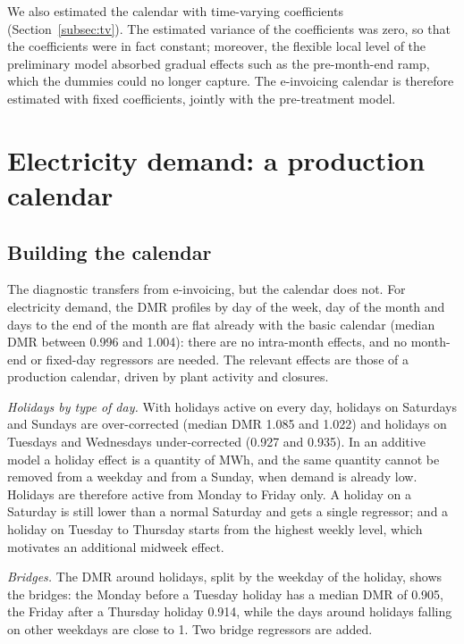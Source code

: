 \documentclass[Afour, times]{sagej}
\begin{document}
We also estimated the calendar with time-varying coefficients (Section~\ref{subsec:tv}). The estimated variance of the coefficients was zero, so that the coefficients were in fact constant; moreover, the flexible local level of the preliminary model absorbed gradual effects such as the pre-month-end ramp, which the dummies could no longer capture. The e-invoicing calendar is therefore estimated with fixed coefficients, jointly with the pre-treatment model.

\section{Electricity demand: a production calendar}
\label{sec:el}

\subsection{Building the calendar}

The diagnostic transfers from e-invoicing, but the calendar does not. For electricity demand, the DMR profiles by day of the week, day of the month and days to the end of the month are flat already with the basic calendar (median DMR between 0.996 and 1.004): there are no intra-month effects, and no month-end or fixed-day regressors are needed. The relevant effects are those of a production calendar, driven by plant activity and closures.

\textit{Holidays by type of day.} With holidays active on every day, holidays on Saturdays and Sundays are over-corrected (median DMR 1.085 and 1.022) and holidays on Tuesdays and Wednesdays under-corrected (0.927 and 0.935). In an additive model a holiday effect is a quantity of MWh, and the same quantity cannot be removed from a weekday and from a Sunday, when demand is already low. Holidays are therefore active from Monday to Friday only. A holiday on a Saturday is still lower than a normal Saturday and gets a single regressor; and a holiday on Tuesday to Thursday starts from the highest weekly level, which motivates an additional midweek effect.

\textit{Bridges.} The DMR around holidays, split by the weekday of the holiday, shows the bridges: the Monday before a Tuesday holiday has a median DMR of 0.905, the Friday after a Thursday holiday 0.914, while the days around holidays falling on other weekdays are close to 1. Two bridge regressors are added.
\end{document}
